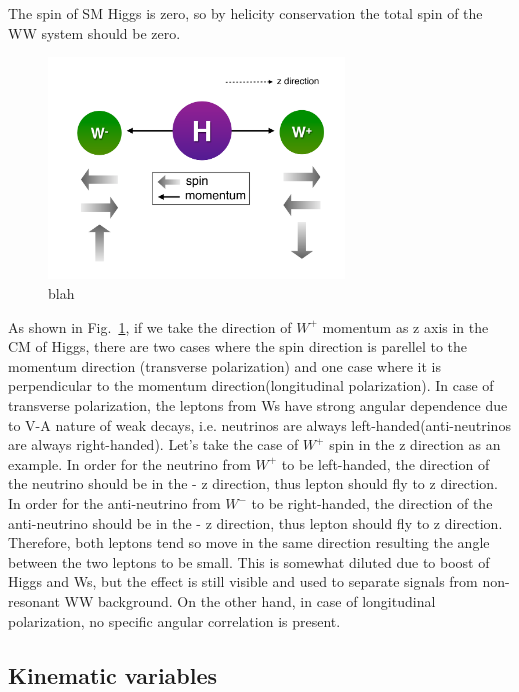 The spin of SM Higgs is zero, so by helicity conservation the total spin 
of the WW system should be zero. 
\begin{figure}[htp]
\centering
\includegraphics[width=0.7\textwidth]{figures/HiggsSpin.pdf}
\caption{ blah }
\label{fig:HiggsSpin}
\end{figure}
As shown in Fig.~\ref{fig:HiggsSpin}, if we take 
the direction of $W^+$ momentum as z axis in the CM of Higgs,
there are two cases where the spin direction is parellel to the 
momentum direction (transverse polarization) and one case where 
it is perpendicular to the momentum direction(longitudinal polarization). 
In case of transverse polarization, the leptons from Ws have strong 
angular dependence due to V-A nature of weak decays, i.e. neutrinos 
are always left-handed(anti-neutrinos are always right-handed). 
Let's take the case of $W^+$ spin in the z direction as an example.
In order for the neutrino from $W^+$ to be left-handed, the direction 
of the neutrino should be in the - z direction, thus lepton should 
fly to z direction. In order for the anti-neutrino from $W^-$ to be 
right-handed, the direction of the anti-neutrino should be in the 
- z direction, thus lepton should fly to z direction.
Therefore, both leptons tend so move in the same direction 
resulting the angle between the two leptons to be small. 
This is somewhat diluted due to boost of Higgs and Ws, 
but the effect is still visible and used to separate signals 
from non-resonant WW background. 
On the other hand, in case of longitudinal polarization, 
no specific angular correlation is present. 


%
\subsection{Kinematic variables}
\label{subsec:kinimetic_variables}

